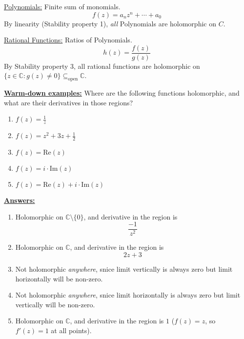 \documentclass{article}
\newcommand{\C}{\mathbb{C}}
\begin{document}
\vskip 0.5cm
\begin{dottedbox}
  \underline{Polynomials:} Finite sum of monomials.
  \[ f(z) = a_nz^n + \cdots + a_0 \]
  By linearity (Stability property 1), \emph{all} Polynomials are holomorphic on $C$.
  
  \vskip 1cm
  \underline{Rational Functions:} Ratios of Polynomials.
  \[ h(z) = \frac{f(z)}{g(z)} \]
  By Stability property 3, all rational functions are holomorphic on $\{ z \in \C : g(z) \neq 0 \} \subseteq_{\text{open}} \C$.
\end{dottedbox}

\vskip 0.5cm
\underline{\textbf{Warm-down examples:}} Where are the following functions holomorphic, and what are their derivatives in those regions?

\begin{enumerate}
  \item $f(z) = \frac{1}{z}$
  \item $f(z) = z^2 + 3z + \frac{1}{2}$
  \item $f(z) = \text{Re}(z)$
  \item $f(z) = i \cdot \text{Im}(z)$
  \item $f(z) = \text{Re}(z) + i \cdot \text{Im}(z)$
\end{enumerate}

\vskip 0.5cm
\underline{\textbf{Answers:}}
\begin{enumerate}
  \item Holomorphic on $\C \setminus \{0\}$, and derivative in the region is 
  \[ \frac{-1}{z^2} \]
  
  \item Holomorphic on $\C$, and derivative in the region is 
  \[ 2z + 3 \]

  \item Not holomorphic \emph{anywhere}, snice limit vertically is always zero but limit horizontally will be non-zero. 

  \item Not holomorphic \emph{anywhere}, snice limit horizontally is always zero but limit vertically will be non-zero. 

  \item Holomorphic on $\C$, and derivative in the region is $1$ ($f(z) = z$, so $f'(z) = 1$ at all points).
\end{enumerate}



\end{document}
